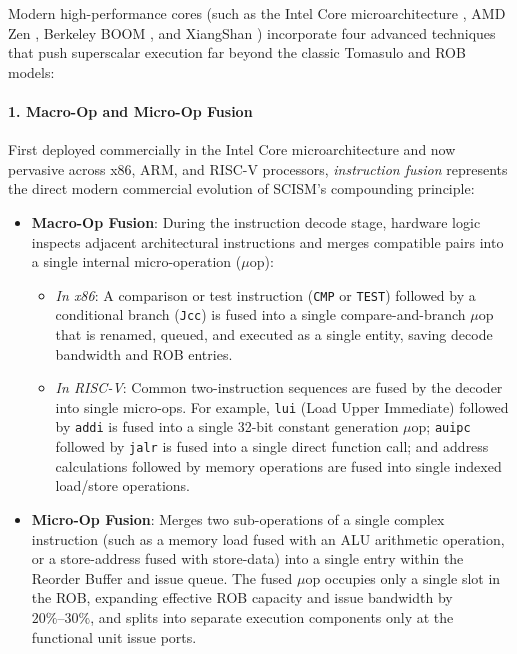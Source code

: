 Modern high-performance cores (such as the Intel Core microarchitecture \cite{gochman2006intel}, AMD Zen \cite{singh2017zen, suggs2020zen2}, Berkeley BOOM \cite{celio2018boom}, and XiangShan \cite{xiangshan2022micro}) incorporate four advanced techniques that push superscalar execution far beyond the classic Tomasulo and ROB models:

\paragraph{1. Macro-Op and Micro-Op Fusion}
First deployed commercially in the Intel Core microarchitecture \cite{gochman2006intel} and now pervasive across x86, ARM, and RISC-V processors, \textit{instruction fusion} represents the direct modern commercial evolution of SCISM's compounding principle:
\begin{itemize}
    \item \textbf{Macro-Op Fusion}: During the instruction decode stage, hardware logic inspects adjacent architectural instructions and merges compatible pairs into a single internal micro-operation ($\mu$op):
    \begin{itemize}
        \item \textit{In x86}: A comparison or test instruction (\texttt{CMP} or \texttt{TEST}) followed by a conditional branch (\texttt{Jcc}) is fused into a single compare-and-branch $\mu$op that is renamed, queued, and executed as a single entity, saving decode bandwidth and ROB entries.
       
        \item \textit{In RISC-V}: Common two-instruction sequences are fused by the decoder into single micro-ops. For example, \texttt{lui} (Load Upper Immediate) followed by \texttt{addi} is fused into a single 32-bit constant generation $\mu$op; \texttt{auipc} followed by \texttt{jalr} is fused into a single direct function call; and address calculations followed by memory operations are fused into single indexed load/store operations.
    \end{itemize}
    \item \textbf{Micro-Op Fusion}: Merges two sub-operations of a single complex instruction (such as a memory load fused with an ALU arithmetic operation, or a store-address fused with store-data) into a single entry within the Reorder Buffer and issue queue. The fused $\mu$op occupies only a single slot in the ROB, expanding effective ROB capacity and issue bandwidth by $20\%\text{--}30\%$, and splits into separate execution components only at the functional unit issue ports.
\end{itemize}

